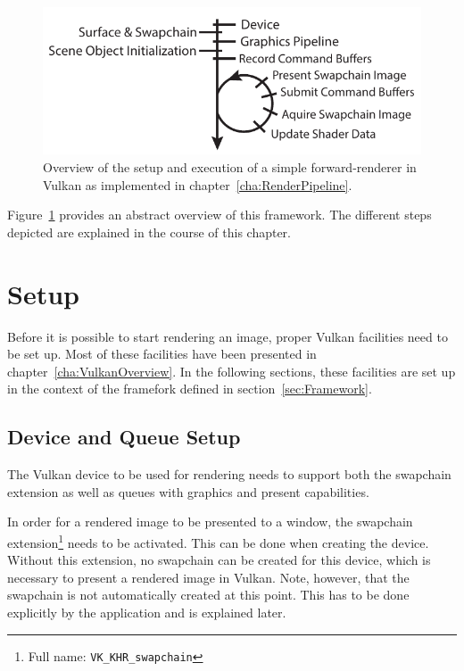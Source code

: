   \begin{figure}
    \includegraphics{Main/Images/RenderSetupAndLoopSimple}
    \centering
    \caption{Overview of the setup and execution of a simple forward-renderer in Vulkan as implemented in chapter~\ref{cha:RenderPipeline}.}
    \label{fig:RenderSetupAndLoopSimple}
  \end{figure}

  Figure~\ref{fig:RenderSetupAndLoopSimple} provides an abstract overview of this framework.
  The different steps depicted are explained in the course of this chapter.


  \section{Setup}
  \label{sec:RenderingSetup}
    Before it is possible to start rendering an image, proper Vulkan facilities need to be set up.
    Most of these facilities have been presented in chapter~\ref{cha:VulkanOverview}.
    In the following sections, these facilities are set up in the context of the framefork defined in section~\ref{sec:Framework}.

    \subsection{Device and Queue Setup}
      The Vulkan device to be used for rendering needs to support both the swapchain extension as well as queues with graphics and present capabilities.

      In order for a rendered image to be presented to a window, the swapchain extension\footnote{Full name: \lstinline{VK_KHR_swapchain}} needs to be activated.
      This can be done when creating the device.
      Without this extension, no swapchain can be created for this device, which is necessary to present a rendered image in Vulkan.
      Note, however, that the swapchain is not automatically created at this point.
      This has to be done explicitly by the application and is explained later.

